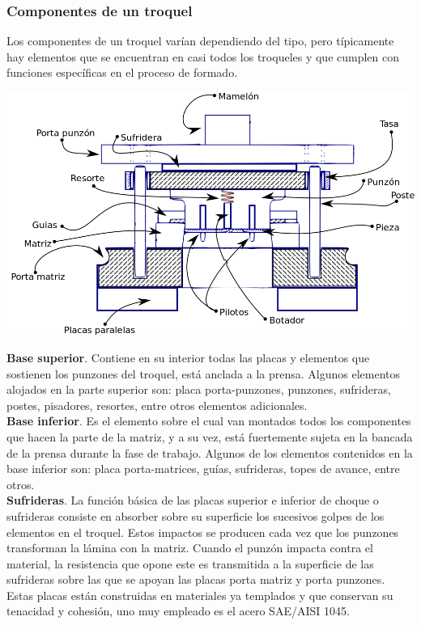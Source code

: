 \subsubsection{Componentes de un troquel}

Los componentes de un troquel varían dependiendo del tipo, pero típicamente hay elementos 
que se encuentran en casi todos los troqueles y que cumplen con funciones específicas 
en el proceso de formado.\\

\begin{center}
\includegraphics[scale=0.3]{src/ch2/componentes_troquel.png}
\label{fig:componentes_troquel}
\end{center}

\textbf{Base superior}. Contiene en su interior todas las placas y elementos que sostienen 
los punzones del troquel, está anclada a la prensa. Algunos elementos alojados en 
la parte superior son: placa porta-punzones, punzones, sufrideras, postes, pisadores, resortes, 
entre otros elementos adicionales.\\

\textbf{Base inferior}. Es el elemento sobre el cual van montados todos los componentes 
que hacen la parte de la matriz, y a su vez, está fuertemente sujeta en la bancada 
de la prensa durante la fase de trabajo. Algunos de los elementos contenidos en 
la base inferior son: placa  porta-matrices, guías, sufrideras, topes de avance, entre 
otros.\\

\textbf{Sufrideras}. La función básica de las placas superior e inferior de choque o sufrideras 
consiste en absorber sobre su superficie los sucesivos golpes de los elementos en el troquel. 
Estos impactos se producen cada vez que los punzones transforman la lámina con la matriz. Cuando 
el punzón impacta contra el material, la resistencia que opone este es transmitida a la 
superficie de las sufrideras sobre las que se apoyan las placas porta matriz y porta punzones. 
Estas placas están construidas en materiales ya templados y que conservan su tenacidad y cohesión, 
uno muy empleado es el acero SAE/AISI 1045.\\

